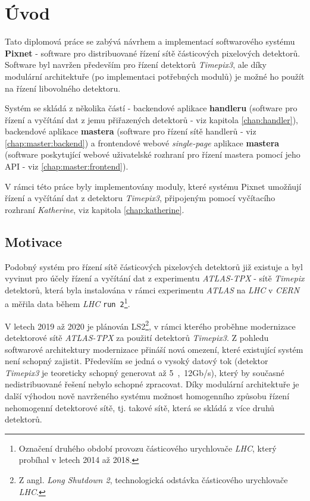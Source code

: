 

\chapter{Úvod}\label{chap01} 
Tato diplomová práce se zabývá návrhem a implementací softwarového systému \textbf{Pixnet} - software pro distribuované řízení sítě částicových pixelových detektorů. Software byl navržen především pro řízení detektorů \textit{Timepix3}, ale díky modulární architektuře (po implementaci potřebných modulů) je možné ho použít na řízení libovolného detektoru.

Systém se skládá z několika částí - backendové aplikace \textbf{handleru} (software pro řízení a vyčítání dat z jemu přiřazených detektorů - viz kapitola \ref{chap:handler}), backendové aplikace \textbf{mastera} (software pro řízení sítě handlerů - viz \ref{chap:master:backend}) a frontendové webové \textit{single-page} aplikace \textbf{mastera} (software poskytující webové uživatelské rozhraní pro řízení mastera pomocí jeho API - viz \ref{chap:master:frontend}).

V rámci této práce byly implementovány moduly, které systému Pixnet umožňují řízení a vyčítání dat z detektoru \textit{Timepix3}, připojeným pomocí vyčítacího rozhraní \textit{Katherine}, viz kapitola \ref{chap:katherine}.

\section{Motivace}
Podobný systém pro řízení sítě částicových pixelových detektorů již existuje \cite{atlastpx_sw,BegeraBcThesis2016} a byl vyvinut pro účely řízení a vyčítání dat z experimentu \textit{ATLAS-TPX} - sítě \textit{Timepix} detektorů, která byla instalována v rámci experimentu \textit{ATLAS} na \textit{LHC} v \textit{CERN} a měřila data během \textit{LHC} \texttt{run 2}\footnote{Označení druhého období provozu částicového urychlovače \textit{LHC}, který probíhal v letech 2014 až 2018.}. 

V letech 2019 až 2020 je plánován LS2\footnote{Z angl. \textit{Long Shutdown 2}, technologická odstávka částicového urychlovače \textit{LHC}.}, v rámci kterého proběhne modernizace detektorové sítě \textit{ATLAS-TPX} za použití detektorů \textit{Timepix3}. Z pohledu softwarové architektury modernizace přináší nová omezení, které existující systém není schopný zajistit. Především se jedná o vysoký datový tok (detektor \textit{Timepix3} je teoreticky schopný generovat až \unit{5,12}{Gb/s}), který by současné nedistribuované řešení nebylo schopné zpracovat. Díky modulární architektuře je další výhodou nově navrženého systému možnost homogenního způsobu řízení nehomogenní detektorové sítě, tj. takové sítě, která se skládá z více druhů detektorů.

